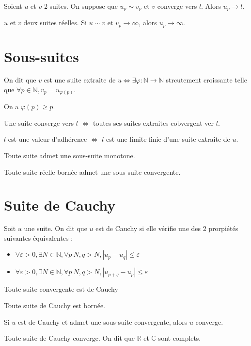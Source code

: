 \documentclass[french]{yLectureNote}
\newcommand{\N}[0]{\mathbb{N}}
\newcommand{\R}[0]{\mathbb{R}}
\newcommand{\C}[0]{\mathbb{C}}
\begin{document}
\begin{proposition}
Soient $u$ et $v$ 2 suites. On suppose que $u_p\sim v_p$ et $v$ converge vers $l$. Alors $u_p\to l$.
\end{proposition}
\begin{proposition}
$u$ et $v$ deux suites réelles. Si $u\sim v$ et $v_p\to\infty$, alors $u_p\to \infty$.
\end{proposition}
\section{Sous-suites}
\begin{definition}
On dit que $v$ est une suite extraite de $u \iff \exists \varphi : \N \to \N$ strcutement croissante telle que $\forall p\in\N, v_p = u_{\varphi(p)}$.

\end{definition}
\begin{proposition}
On a $\varphi(p) \geq p$.
\end{proposition}
\begin{proposition}
Une suite converge vers $l$ $\iff$ toutes ses suites extraites cobvergent ver $l$.
\end{proposition}
\begin{definition}
$l$ est une valeur d'adhérence $\iff$ $l$ est une limite finie d'une suite extraite de $u$.
\end{definition}
\begin{proposition}
Toute suite admet une sous-suite monotone.
\end{proposition}
\begin{theorem}
 Toute suite réelle bornée admet une sous-suite convergente.
\end{theorem}
\section{Suite de Cauchy}
\begin{definition}
Soit $u$ une suite. On dit que $u$ est de Cauchy si elle vérifie une des 2 prorpiétés suivantes équivalentes :
\begin{itemize}
 \item $\forall \varepsilon>0, \exists N\in\N, \forall p\>N, q>N, |u_p-u_q|\leq\varepsilon$
  \item $\forall \varepsilon>0, \exists N\in\N, \forall p\>N, q>N, |u_{p+q}-u_p|\leq\varepsilon$
\end{itemize}
\end{definition}
\begin{proposition}
Toute suite convergente est de Cauchy
\end{proposition}
\begin{proposition}
Toute suite de Cauchy est bornée.
\end{proposition}
\begin{proposition}
Si $u$ est de Cauchy et admet une sous-suite convergente, alors $u$ converge.
\end{proposition}
\begin{theorem}
 Toute suite de Cauchy converge. On dit que $\R$ et $\C$ sont complets.
\end{theorem}
\end{document}
